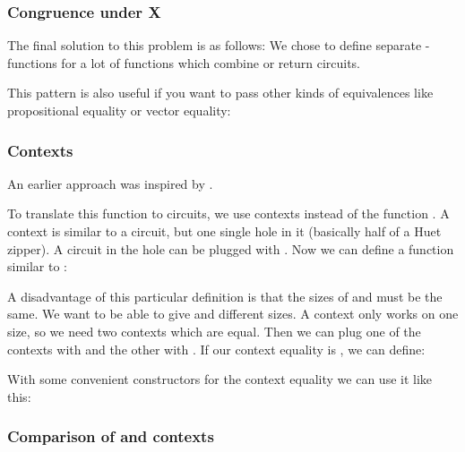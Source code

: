 \subsubsection{Congruence under X}\label{congruence-under-x}

The final solution to this problem is as follows:
We chose to define separate -functions for a lot of
functions which combine or return circuits.


This pattern is also useful if you want to pass other kinds of
equivalences like propositional equality or vector equality:


\subsubsection{Contexts}\label{contexts}

An earlier approach was inspired by .

To translate this function to circuits, we use contexts instead of the
function .
A context is similar to a circuit, but one single hole in it
(basically half of a Huet zipper).
A circuit in the hole can be plugged with .
Now we can define a function similar to :


A disadvantage of this particular definition is that the sizes of
 and  must be the same.
We want to be able to give  and  different sizes.
A context only works on one size, so we need two contexts which are
equal.
Then we can plug one of the contexts with  and the other with
.
If our context equality is , we can define:


With some convenient constructors for the context equality 
we can use it like this:


\subsubsection{\texorpdfstring{Comparison of  and contexts}{Comparison of X-cong and contexts}}\label{comparison-of-x-cong-and-contexts}

